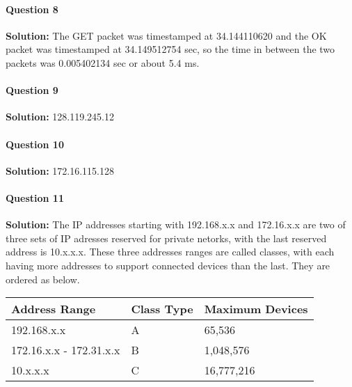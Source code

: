 \documentclass[12pt]{article}
\begin{document}
\paragraph{Question 8}
\textbf{Solution: }
The GET packet was timestamped at 34.144110620 and the OK packet was timestamped at 34.149512754 sec, so the time in between the two packets was 0.005402134 sec or about 5.4 ms.

\paragraph{Question 9\\}
\textbf{Solution: }
128.119.245.12

\paragraph{Question 10\\}
\textbf{Solution: }
172.16.115.128

\paragraph{Question 11\\}
\textbf{Solution: }
The IP addresses starting with 192.168.x.x and 172.16.x.x are two of three sets of IP adresses reserved for private netorks, with the last reserved address is 10.x.x.x. These three addresses ranges are called classes, with each having more addresses to support connected devices than the last. They are ordered as below. 
\begin{center}
	\begin{tabular}{ | l | l | l |}
	\hline
	Address Range & Class Type & Maximum Devices \\ \hline
	192.168.x.x & A & 65,536 \\ \hline
	172.16.x.x - 172.31.x.x & B & 1,048,576 \\ \hline
	10.x.x.x & C & 16,777,216 \\ \hline
	\end{tabular}
\end{center}
\end{document}
